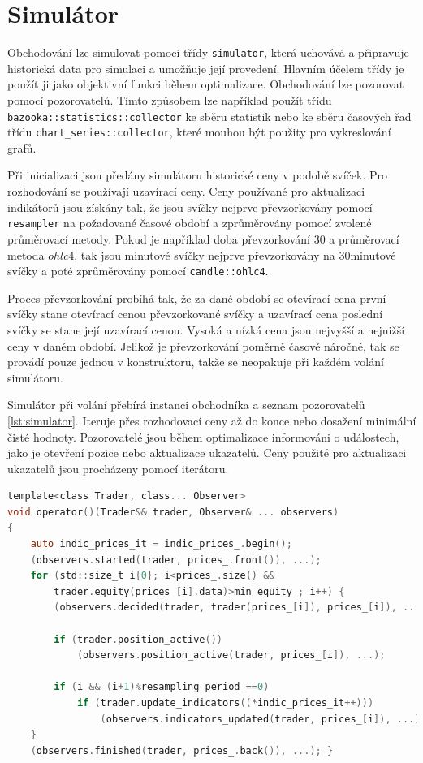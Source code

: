 \section{Simulátor}
Obchodování lze simulovat pomocí třídy \texttt{simulator}, která uchovává a připravuje historická data pro simulaci a umožňuje její provedení.
Hlavním účelem třídy je použít ji jako objektivní funkci během optimalizace.
Obchodování lze pozorovat pomocí pozorovatelů.
Tímto způsobem lze například použít třídu \texttt{bazooka::statistics::collector} ke sběru statistik nebo ke sběru časových řad třídu \texttt{chart\_series::collector}, které mouhou být použity pro vykreslování grafů.

Při inicializaci jsou předány simulátoru historické ceny v podobě svíček.
Pro rozhodování se používají uzavírací ceny.
Ceny používané pro aktualizaci indikátorů jsou získány tak, že jsou svíčky nejprve převzorkovány pomocí \texttt{resampler} na požadované časové období a zprůměrovány pomocí zvolené průměrovací metody.
Pokud je například doba převzorkování 30 a průměrovací metoda $ohlc4$, tak jsou minutové svíčky nejprve převzorkovány na 30minutové svíčky a poté zprůměrovány pomocí \texttt{candle::ohlc4}.

Proces převzorkování probíhá tak, že za dané období se otevírací cena první svíčky stane otevírací cenou převzorkované svíčky a uzavírací cena poslední svíčky se stane její uzavírací cenou.
Vysoká a nízká cena jsou nejvyšší a nejnižší ceny v daném období.
Jelikož je převzorkování poměrně časově náročné, tak se provádí pouze jednou v konstruktoru, takže se neopakuje při každém volání simulátoru.

Simulátor při volání přebírá instanci obchodníka a seznam pozorovatelů \ref{lst:simulator}.
Iteruje přes rozhodovací ceny až do konce nebo dosažení minimální čisté hodnoty.
Pozorovatelé jsou během optimalizace informováni o událostech, jako je otevření pozice nebo aktualizace ukazatelů.
Ceny použité pro aktualizaci ukazatelů jsou procházeny pomocí iterátoru.

\begin{lstlisting}[caption={~Implementace simulace obchodování},label={lst:simulator},captionpos=t,abovecaptionskip=-\medskipamount,belowcaptionskip=\medskipamount,language=C]
template<class Trader, class... Observer>
void operator()(Trader&& trader, Observer& ... observers)
{
    auto indic_prices_it = indic_prices_.begin();
    (observers.started(trader, prices_.front()), ...);
    for (std::size_t i{0}; i<prices_.size() && 
        trader.equity(prices_[i].data)>min_equity_; i++) {
        (observers.decided(trader, trader(prices_[i]), prices_[i]), ...);

        if (trader.position_active())
            (observers.position_active(trader, prices_[i]), ...);

        if (i && (i+1)%resampling_period_==0)
            if (trader.update_indicators((*indic_prices_it++)))
                (observers.indicators_updated(trader, prices_[i]), ...);
    }
    (observers.finished(trader, prices_.back()), ...); }
\end{lstlisting}

